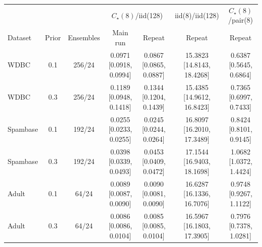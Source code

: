 \begin{tabular}{lcccccc}
\toprule
 & & & \multicolumn{2}{c}{$C_\star(8)$/iid(128)} & iid(8)/iid(128) & $C_\star(8)$/pair(8) \\
\cmidrule(lr){4-5}
Dataset & Prior & Ensembles & Main run & Repeat & Repeat & Repeat \\
\midrule
WDBC & 0.1 & 256/24 & \shortstack{0.0971 \\{} [0.0918, 0.0994]} & \shortstack{0.0867 \\{} [0.0865, 0.0887]} & \shortstack{15.3823 \\{} [14.8143, 18.4268]} & \shortstack{0.6387 \\{} [0.5645, 0.6864]} \\[2pt]
WDBC & 0.3 & 256/24 & \shortstack{0.1189 \\{} [0.0948, 0.1418]} & \shortstack{0.1344 \\{} [0.1204, 0.1439]} & \shortstack{15.4385 \\{} [14.9612, 16.8423]} & \shortstack{0.7365 \\{} [0.6997, 0.7433]} \\[2pt]
Spambase & 0.1 & 192/24 & \shortstack{0.0255 \\{} [0.0233, 0.0255]} & \shortstack{0.0245 \\{} [0.0244, 0.0264]} & \shortstack{16.8097 \\{} [16.2010, 17.3489]} & \shortstack{0.8424 \\{} [0.8101, 0.9145]} \\[2pt]
Spambase & 0.3 & 192/24 & \shortstack{0.0398 \\{} [0.0339, 0.0493]} & \shortstack{0.0453 \\{} [0.0409, 0.0472]} & \shortstack{17.1544 \\{} [16.9403, 18.1698]} & \shortstack{1.0682 \\{} [1.0372, 1.4424]} \\[2pt]
Adult & 0.1 & 64/24 & \shortstack{0.0089 \\{} [0.0087, 0.0090]} & \shortstack{0.0090 \\{} [0.0081, 0.0090]} & \shortstack{16.6287 \\{} [16.1336, 16.7076]} & \shortstack{0.9748 \\{} [0.9267, 1.1122]} \\[2pt]
Adult & 0.3 & 64/24 & \shortstack{0.0086 \\{} [0.0086, 0.0104]} & \shortstack{0.0085 \\{} [0.0085, 0.0104]} & \shortstack{16.5967 \\{} [16.1803, 17.3905]} & \shortstack{0.7976 \\{} [0.7378, 1.0281]} \\[2pt]
\bottomrule
\end{tabular}
